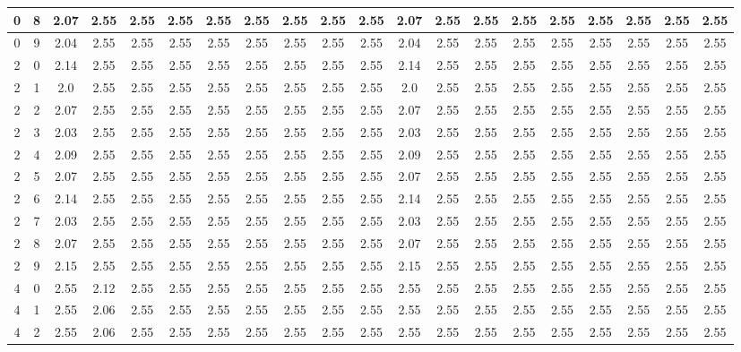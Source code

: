 \begin{landscape}
\begin{longtable}{|c|c||c||c|c|c|c|c|c|c|c||c|c|c|c|c|c|c|c|c|}
	0 & 8 & 2.07 & 2.55 & 2.55 & 2.55 & 2.55 & 2.55 & 2.55 & 2.55 & 2.55 & 2.07 & 2.55 & 2.55 & 2.55 & 2.55 & 2.55 & 2.55 & 2.55 & 2.55 \\ \hline
	0 & 9 & 2.04 & 2.55 & 2.55 & 2.55 & 2.55 & 2.55 & 2.55 & 2.55 & 2.55 & 2.04 & 2.55 & 2.55 & 2.55 & 2.55 & 2.55 & 2.55 & 2.55 & 2.55 \\ \hline
	2 & 0 & 2.14 & 2.55 & 2.55 & 2.55 & 2.55 & 2.55 & 2.55 & 2.55 & 2.55 & 2.14 & 2.55 & 2.55 & 2.55 & 2.55 & 2.55 & 2.55 & 2.55 & 2.55 \\ \hline
	2 & 1 & 2.0 & 2.55 & 2.55 & 2.55 & 2.55 & 2.55 & 2.55 & 2.55 & 2.55 & 2.0 & 2.55 & 2.55 & 2.55 & 2.55 & 2.55 & 2.55 & 2.55 & 2.55 \\ \hline
	2 & 2 & 2.07 & 2.55 & 2.55 & 2.55 & 2.55 & 2.55 & 2.55 & 2.55 & 2.55 & 2.07 & 2.55 & 2.55 & 2.55 & 2.55 & 2.55 & 2.55 & 2.55 & 2.55 \\ \hline
	2 & 3 & 2.03 & 2.55 & 2.55 & 2.55 & 2.55 & 2.55 & 2.55 & 2.55 & 2.55 & 2.03 & 2.55 & 2.55 & 2.55 & 2.55 & 2.55 & 2.55 & 2.55 & 2.55 \\ \hline
	2 & 4 & 2.09 & 2.55 & 2.55 & 2.55 & 2.55 & 2.55 & 2.55 & 2.55 & 2.55 & 2.09 & 2.55 & 2.55 & 2.55 & 2.55 & 2.55 & 2.55 & 2.55 & 2.55 \\ \hline
	2 & 5 & 2.07 & 2.55 & 2.55 & 2.55 & 2.55 & 2.55 & 2.55 & 2.55 & 2.55 & 2.07 & 2.55 & 2.55 & 2.55 & 2.55 & 2.55 & 2.55 & 2.55 & 2.55 \\ \hline
	2 & 6 & 2.14 & 2.55 & 2.55 & 2.55 & 2.55 & 2.55 & 2.55 & 2.55 & 2.55 & 2.14 & 2.55 & 2.55 & 2.55 & 2.55 & 2.55 & 2.55 & 2.55 & 2.55 \\ \hline
	2 & 7 & 2.03 & 2.55 & 2.55 & 2.55 & 2.55 & 2.55 & 2.55 & 2.55 & 2.55 & 2.03 & 2.55 & 2.55 & 2.55 & 2.55 & 2.55 & 2.55 & 2.55 & 2.55 \\ \hline
	2 & 8 & 2.07 & 2.55 & 2.55 & 2.55 & 2.55 & 2.55 & 2.55 & 2.55 & 2.55 & 2.07 & 2.55 & 2.55 & 2.55 & 2.55 & 2.55 & 2.55 & 2.55 & 2.55 \\ \hline
	2 & 9 & 2.15 & 2.55 & 2.55 & 2.55 & 2.55 & 2.55 & 2.55 & 2.55 & 2.55 & 2.15 & 2.55 & 2.55 & 2.55 & 2.55 & 2.55 & 2.55 & 2.55 & 2.55 \\ \hline
	4 & 0 & 2.55 & 2.12 & 2.55 & 2.55 & 2.55 & 2.55 & 2.55 & 2.55 & 2.55 & 2.55 & 2.55 & 2.55 & 2.55 & 2.55 & 2.55 & 2.55 & 2.55 & 2.55 \\ \hline
	4 & 1 & 2.55 & 2.06 & 2.55 & 2.55 & 2.55 & 2.55 & 2.55 & 2.55 & 2.55 & 2.55 & 2.55 & 2.55 & 2.55 & 2.55 & 2.55 & 2.55 & 2.55 & 2.55 \\ \hline
	4 & 2 & 2.55 & 2.06 & 2.55 & 2.55 & 2.55 & 2.55 & 2.55 & 2.55 & 2.55 & 2.55 & 2.55 & 2.55 & 2.55 & 2.55 & 2.55 & 2.55 & 2.55 & 2.55 \\ \hline

\end{longtable}
\end{landscape}
